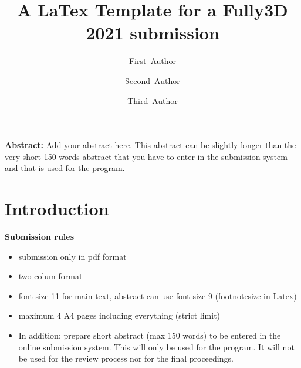 \documentclass[11pt,twocolumn,twoside]{article}
\begin{document}
\title{A LaTex Template for a Fully3D 2021 submission} 

\author[1]{\small First~Author}
\author[1]{\small Second~Author}
\author[2]{\small Third~Author}



\maketitle
\thispagestyle{fancy}



\footnotesize
\textbf{Abstract:}
Add your abstract here. This abstract can be slightly longer than the very short 
150 words abstract that you have to enter in the submission system and that is used 
for the program. 

\normalsize




\section{Introduction}

\textbf{\color{red}Submission rules}
\begin{itemize}
\color{red}
\item submission only in pdf format
\item two colum format
\item font size 11 for main text, abstract can use font size 9 (footnotesize in Latex)
\item maximum 4 A4 pages including everything (strict limit)
\item In addition: prepare short abstract (max 150 words) to be entered in the online submission system. 
      This will only be used for the program. 
      It will not be used for the review process nor for the final proceedings.
\end{itemize}
\end{document}
